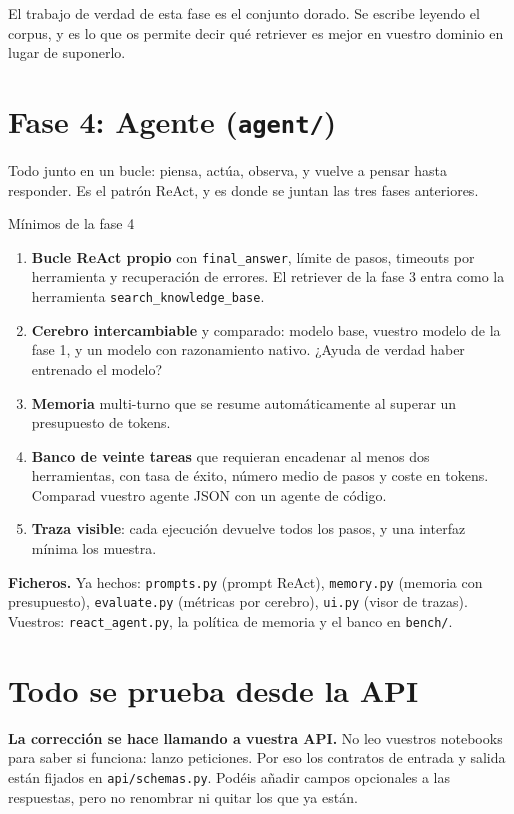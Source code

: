 \documentclass[11pt,a4paper]{article}
\newcommand{\code}[1]{{\small\texttt{#1}}}
\newcommand{\file}[1]{{\small\texttt{\textcolor{arcablue}{#1}}}}
\begin{document}
El trabajo de verdad de esta fase es el conjunto dorado. Se escribe leyendo el corpus, y es
lo que os permite decir qué retriever es mejor en vuestro dominio en lugar de suponerlo.

\section{Fase 4: Agente (\file{agent/})}

Todo junto en un bucle: piensa, actúa, observa, y vuelve a pensar hasta responder. Es el
patrón ReAct, y es donde se juntan las tres fases anteriores.

\begin{minimos}{Mínimos de la fase 4}
\begin{enumerate}
  \item \textbf{Bucle ReAct propio} con \code{final\_answer}, límite de pasos, timeouts por
  herramienta y recuperación de errores. El retriever de la fase 3 entra como la herramienta
  \code{search\_knowledge\_base}.
  \item \textbf{Cerebro intercambiable} y comparado: modelo base, vuestro modelo de la
  fase 1, y un modelo con razonamiento nativo. ¿Ayuda de verdad haber entrenado el modelo?
  \item \textbf{Memoria} multi-turno que se resume automáticamente al superar un presupuesto
  de tokens.
  \item \textbf{Banco de veinte tareas} que requieran encadenar al menos dos herramientas,
  con tasa de éxito, número medio de pasos y coste en tokens. Comparad vuestro agente JSON
  con un agente de código.
  \item \textbf{Traza visible}: cada ejecución devuelve todos los pasos, y una interfaz
  mínima los muestra.
\end{enumerate}
\end{minimos}

\textbf{Ficheros.} Ya hechos: \file{prompts.py} (prompt ReAct), \file{memory.py} (memoria con
presupuesto), \file{evaluate.py} (métricas por cerebro), \file{ui.py} (visor de trazas).
Vuestros: \file{react\_agent.py}, la política de memoria y el banco en \file{bench/}.

\section{Todo se prueba desde la API}

\textbf{La corrección se hace llamando a vuestra API.} No leo vuestros notebooks para saber
si funciona: lanzo peticiones. Por eso los contratos de entrada y salida están fijados en
\file{api/schemas.py}. Podéis añadir campos opcionales a las respuestas, pero no renombrar ni
quitar los que ya están.
\end{document}

